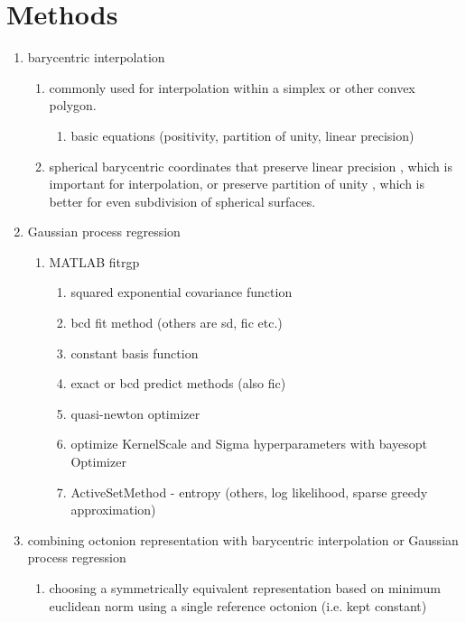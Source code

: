 \section{Methods} \label{sec:methods}

\begin{enumerate}
    \item barycentric interpolation
    \begin{enumerate}
        \item commonly used for interpolation within a simplex or other convex polygon.
        \begin{enumerate}
            \item basic equations (positivity, partition of unity, linear precision) \cite{Langer2006SphericalCoordinates}
        \end{enumerate}
        \item spherical barycentric coordinates that preserve linear precision \cite{Langer2006SphericalCoordinates}, which is important for interpolation, or preserve partition of unity \cite{Lei2020ASystems}, which is better for even subdivision of spherical surfaces.
    \end{enumerate}
    \item Gaussian process regression
    \begin{enumerate}
        \item MATLAB fitrgp
        \begin{enumerate}
            \item squared exponential covariance function
            \item bcd fit method (others are sd, fic etc.)
            \item constant basis function
            \item exact or bcd predict methods (also fic)
            \item quasi-newton optimizer
            \item optimize KernelScale and Sigma hyperparameters with bayesopt Optimizer
            \item ActiveSetMethod - entropy (others, log likelihood, sparse greedy approximation)
        \end{enumerate}
    \end{enumerate}
\item combining octonion representation with barycentric interpolation or Gaussian process regression
    \begin{enumerate}
        \item choosing a symmetrically equivalent representation based on minimum euclidean norm using a single reference octonion (i.e. kept constant)

\end{enumerate}
\end{enumerate}
